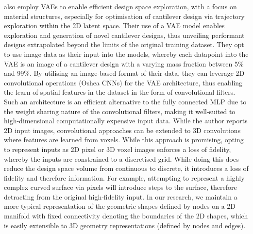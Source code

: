 \documentclass{article}
\begin{document}
\cite{Lew2021} also employ VAEs to enable efficient design space exploration, with a focus on material structures, especially for optimisation of cantilever design via trajectory exploration within the 2D latent space. Their use of a VAE model enables exploration and generation of novel cantilever designs, thus unveiling performant designs extrapolated beyond the limits of the original training dataset. They opt to use image data as their input into the models, whereby each datapoint into the VAE is an image of a cantilever design with a varying mass fraction between 5\% and 99\%. By utilising an image-based format of their data, they can leverage 2D convolutional operations (Oshea CNNs) for the VAE architecture, thus enabling the learn of spatial features in the dataset in the form of convolutional filters. Such an architecture is an efficient alternative to the fully connected MLP due to the weight sharing nature of the convolutional filters, making it well-suited to high-dimensional computationally expensive input data. While the author reports 2D input images, convolutional approaches can be extended to 3D convolutions where features are learned from voxels. While this approach is promising, opting to represent inputs as 2D pixel or 3D voxel images enforces a loss of fidelity, whereby the inputs are constrained to a discretised grid. While doing this does reduce the design space volume from continuous to discrete, it introduces a loss of fidelity and therefore information. For example, attempting to represent a highly complex curved surface via pixels will introduce steps to the surface, therefore detracting from the original high-fidelity input. In our research, we maintain a more typical  representation of the geometric shapes defined by nodes on a 2D manifold with fixed connectivity denoting the boundaries of the 2D shapes, which is easily extensible to 3D geometry representations (defined by nodes and edges).



\newpage
\end{document}
